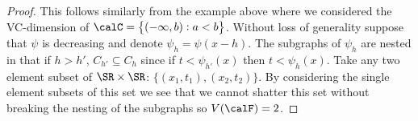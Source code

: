 \begin{proof}
	This follows similarly from the example above where we considered the VC-dimension of \(\calC = \left\{(-\infty,b):a<b\right\}\). Without loss of generality suppose that \(\psi\) is decreasing and denote \(\psi_h = \psi(x-h)\). The subgraphs of \(\psi_h\) are nested in that if \(h > h'\), \(C_{h'} \subseteq C_{h}\) since if \(t < \psi_{h'}(x)\) then \(t < \psi_h(x)\). Take any two element subset of \(\SR\times\SR\): \(\{(x_1,t_1),(x_2,t_2)\}\). By considering the single element subsets of this set we see that we cannot shatter this set without breaking the nesting of the subgraphs so \(V(\calF)=2\). 
\end{proof}


